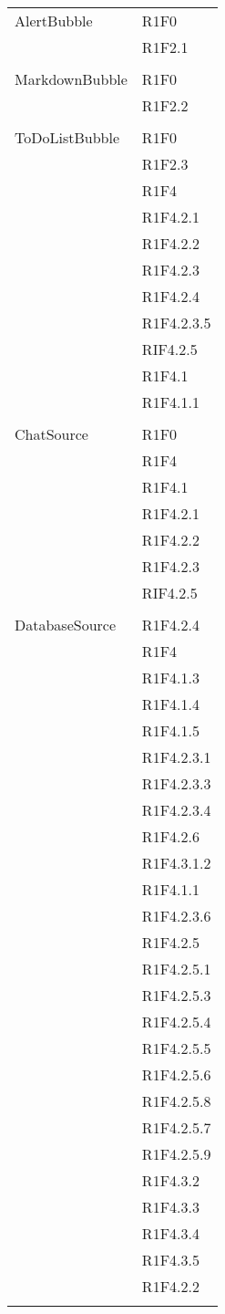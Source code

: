 \begin{center}
\begin{longtable}{|p{7cm}|p{7cm}|}
		AlertBubble & R1F0 \\ & R1F2.1 \\ & \\ \hline
		MarkdownBubble & R1F0 \\ & R1F2.2 \\ & \\ \hline
		ToDoListBubble & R1F0 \\ & R1F2.3 \\ & R1F4 \\ & R1F4.2.1 \\ & R1F4.2.2 \\ & R1F4.2.3 \\ & R1F4.2.4 \\ & R1F4.2.3.5 \\ & RIF4.2.5 \\ & R1F4.1 \\ & R1F4.1.1 \\ & \\ \hline
		ChatSource & R1F0 \\ & R1F4 \\ & R1F4.1 \\ & R1F4.2.1 \\ & R1F4.2.2 \\ & R1F4.2.3 \\ & RIF4.2.5 \\ & \\ \hline
		DatabaseSource & R1F4.2.4 \\ & R1F4 \\ & R1F4.1.3 \\ & R1F4.1.4 \\ & R1F4.1.5 \\ & R1F4.2.3.1 \\ & R1F4.2.3.3 \\ & R1F4.2.3.4 \\ & R1F4.2.6 \\ & R1F4.3.1.2 \\ & R1F4.1.1 \\ & R1F4.2.3.6 \\ & R1F4.2.5 \\ & R1F4.2.5.1 \\ & R1F4.2.5.3 \\ & R1F4.2.5.4 \\ & R1F4.2.5.5 \\ & R1F4.2.5.6 \\ & R1F4.2.5.8 \\ & R1F4.2.5.7 \\ & R1F4.2.5.9 \\ & R1F4.3.2 \\ & R1F4.3.3 \\ & R1F4.3.4 \\ & R1F4.3.5 \\ & R1F4.2.2 \\ & \\ \hline

\end{longtable}
\end{center}
